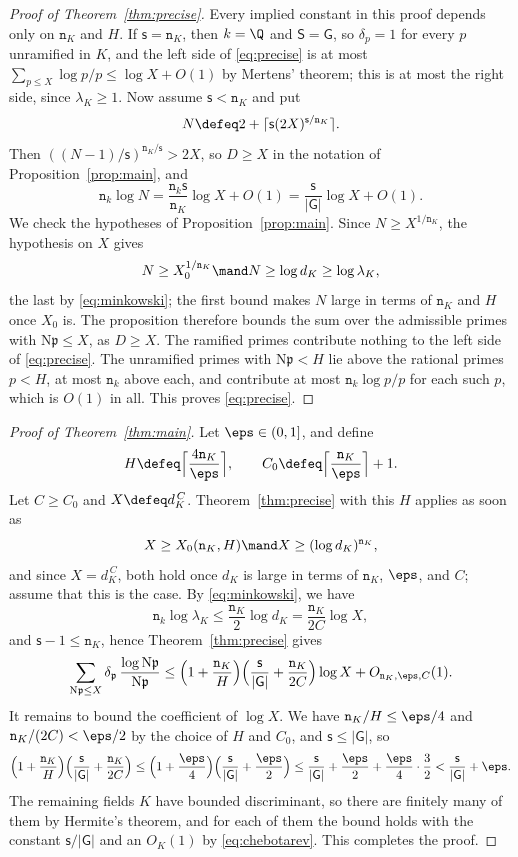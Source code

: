 \documentclass[11pt, reqno, twoside, letterpaper]{amsart}
\newcommand{\Nm}{\mathrm{N}}
\newcommand{\fp}{\mathfrak{p}}
\newcommand{\dk}{{\mathtt{n}_k}}
\newcommand{\dK}{{\mathtt{n}_K}}
\newcommand{\wgt}{H}
\newcommand{\bxs}{N}
\newcommand{\dgb}{D}
\newcommand{\expC}{C}
\newcommand{\XX}{X}
\newcommand{\lamK}{\lambda_{\Kf}}
\newcommand{\galKk}{\mathsf{G}}
\newcommand{\Kf}{K}
\newcommand{\wt}{\delta}
\newcommand{\Sset}{\mathsf{S}}
\newcommand{\nS}{\mathsf{s}}
\begin{document}
\begin{proof}[Proof of Theorem~\ref{thm:precise}]
Every implied constant in this proof depends only on $\dK$ and
$\wgt$. If $\nS=\dK$, then $k=\Q$ and $\Sset=\galKk$, so $\wt_p=1$ for
every $p$ unramified in $\Kf$, and the left side of \eqref{eq:precise}
is at most $\sum_{p\le\XX}\log p/p\le\log\XX+O(1)$ by Mertens'
theorem; this is at most the right side, since $\lamK\ge 1$. Now
assume $\nS<\dK$ and put
\[
\bxs\defeq 2+\lceil\nS(2\XX)^{\nS/\dK}\rceil .
\]
Then $((\bxs-1)/\nS)^{\dK/\nS}>2\XX$, so $\dgb\ge\XX$ in the notation
of Proposition~\ref{prop:main}, and
\[
\dk\log\bxs=\frac{\dk\nS}{\dK}\log\XX+O(1)
=\frac{\nS}{|\galKk|}\log\XX+O(1).
\]
We check the hypotheses of Proposition~\ref{prop:main}. Since
$\bxs\ge\XX^{1/\dK}$, the hypothesis on $\XX$ gives
\[
\bxs\ge\XX_0^{1/\dK}\mand\bxs\ge\log d_\Kf\ge\log\lamK,
\]
the last by \eqref{eq:minkowski}; the first bound makes $\bxs$ large
in terms of $\dK$ and $\wgt$ once $\XX_0$ is. The proposition
therefore bounds the sum over the admissible primes with
$\Nm\fp\le\XX$, as $\dgb\ge\XX$. The ramified primes contribute
nothing to the left side of \eqref{eq:precise}. The unramified primes
with $\Nm\fp<\wgt$ lie above the rational primes $p<\wgt$, at most
$\dk$ above each, and contribute at most $\dk\log p/p$ for each such
$p$, which is $O(1)$ in all. This proves \eqref{eq:precise}.
\end{proof}

\begin{proof}[Proof of Theorem~\ref{thm:main}]
Let $\eps\in(0,1]$, and define
\[
\wgt\defeq\Big\lceil\frac{4\dK}{\eps}\Big\rceil,\qquad
\expC_0\defeq\Big\lceil\frac{\dK}{\eps}\Big\rceil+1 .
\]
Let $\expC\ge\expC_0$ and $\XX\defeq d_\Kf^{\,\expC}$.
Theorem~\ref{thm:precise}
with this $\wgt$ applies as soon as
\[
\XX\ge\XX_0(\dK,\wgt)\mand\XX\ge(\log d_\Kf)^{\dK},
\]
and since $\XX=d_\Kf^{\,\expC}$, both hold once $d_\Kf$ is large in
terms of $\dK$, $\eps$, and $\expC$; assume that this is the case. By
\eqref{eq:minkowski}, we have
\[
\dk\log\lamK\le\frac{\dK}{2}\log d_\Kf=\frac{\dK}{2\expC}\log\XX,
\]
and $\nS-1\le\dK$, hence Theorem~\ref{thm:precise} gives
\[
\sum_{\Nm\fp\le\XX}\wt_\fp\,\frac{\log\Nm\fp}{\Nm\fp}
\le\Big(1+\frac{\dK}{\wgt}\Big)
\Big(\frac{\nS}{|\galKk|}+\frac{\dK}{2\expC}\Big)\log\XX
+O_{\dK,\eps,\expC}(1).
\]
It remains to bound the coefficient of $\log\XX$. We have
$\dK/\wgt\le\eps/4$ and $\dK/(2\expC)<\eps/2$ by the choice of
$\wgt$ and $\expC_0$, and $\nS\le|\galKk|$, so
\[
\Big(1+\frac{\dK}{\wgt}\Big)\Big(\frac{\nS}{|\galKk|}+\frac{\dK}{2\expC}\Big)
\le\Big(1+\frac{\eps}{4}\Big)\Big(\frac{\nS}{|\galKk|}+\frac{\eps}{2}\Big)
\le\frac{\nS}{|\galKk|}+\frac{\eps}{2}+\frac{\eps}{4}\cdot\frac32
<\frac{\nS}{|\galKk|}+\eps .
\]
The remaining fields $\Kf$ have bounded discriminant, so there are
finitely many of them by Hermite's theorem, and for each of them the
bound holds with the constant $\nS/|\galKk|$ and an $O_\Kf(1)$ by
\eqref{eq:chebotarev}. This completes the proof.
\end{proof}
\end{document}
